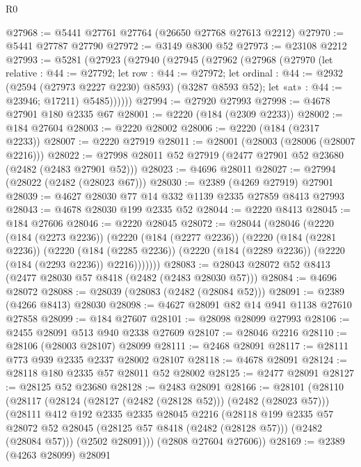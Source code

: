 \begin{lexlean}{R0}
\begin{coremodule}
@27968 := @5441 @27761 @27764 (@26650 @27768 @27613 @2212)
@27970 := @5441 @27787 @27790
@27972 := @3149 @8300 @52
@27973 := @23108 @2212
@27993 := @5281
    (@27923
      (@27940
        (@27945
          (@27962
            (@27968
              (@27970
                (let relative : @44 := @27792;
                let row : @44 := @27972;
                let ordinal : @44 := @2932 (@2594 (@27973 @2227 @2230) @8593) (@3287 @8593 @52);
                let «at» : @44 := @23946; @17211)
                @5485))))))
@27994 := @27920 @27993
@27998 := @4678 @27901 @180 @2335 @67
@28001 := @2220 (@184 (@2309 @2233))
@28002 := @184 @27604
@28003 := @2220 @28002
@28006 := @2220 (@184 (@2317 @2233))
@28007 := @2220 @27919
@28011 := @28001 (@28003 (@28006 (@28007 @2216)))
@28022 := @27998 @28011 @52 @27919 (@2477 @27901 @52 @23680 (@2482 (@2483 @27901 @52)))
@28023 := @4696 @28011
@28027 := @27994 (@28022 (@2482 (@28023 @67)))
@28030 := @2389 (@4269 @27919) @27901
@28039 := @4627 @28030 @77 @14 @332 @1139 @2335 @27859 @8413 @27993
@28043 := @4678 @28030 @199 @2335 @52
@28044 := @2220 @8413
@28045 := @184 @27606
@28046 := @2220 @28045
@28072 := @28044
    (@28046
      (@2220
        (@184 (@2273 @2236))
        (@2220
          (@184 (@2277 @2236))
          (@2220
            (@184 (@2281 @2236))
            (@2220
              (@184 (@2285 @2236))
              (@2220 (@184 (@2289 @2236)) (@2220 (@184 (@2293 @2236)) @2216)))))))
@28083 := @28043 @28072 @52 @8413 (@2477 @28030 @57 @8418 (@2482 (@2483 @28030 @57)))
@28084 := @4696 @28072
@28088 := @28039 (@28083 (@2482 (@28084 @52)))
@28091 := @2389 (@4266 @8413) @28030
@28098 := @4627 @28091 @82 @14 @941 @1138 @27610 @27858
@28099 := @184 @27607
@28101 := @28098 @28099 @27993
@28106 := @2455 @28091 @513 @940 @2338 @27609
@28107 := @28046 @2216
@28110 := @28106 (@28003 @28107) @28099
@28111 := @2468 @28091
@28117 := @28111 @773 @939 @2335 @2337 @28002 @28107
@28118 := @4678 @28091
@28124 := @28118 @180 @2335 @57 @28011 @52 @28002
@28125 := @2477 @28091
@28127 := @28125 @52 @23680
@28128 := @2483 @28091
@28166 := @28101
    (@28110
      (@28117
        (@28124 (@28127 (@2482 (@28128 @52))) (@2482 (@28023 @57)))
        (@28111
          @412
          @192
          @2335
          @2335
          @28045
          @2216
          (@28118
            @199
            @2335
            @57
            @28072
            @52
            @28045
            (@28125 @57 @8418 (@2482 (@28128 @57)))
            (@2482 (@28084 @57)))
          (@2502 @28091)))
      (@2808 @27604 @27606))
@28169 := @2389 (@4263 @28099) @28091

\end{coremodule}
\end{lexlean}
